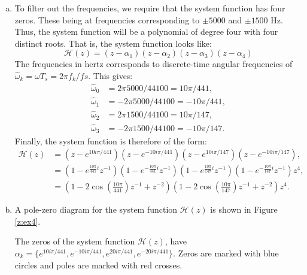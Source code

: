 \begin{enumerate}
\begin{enumerate}[a)]
\item To filter out the frequencies, we require that the system function has four zeros. These being at frequencies corresponding to $\pm5000$ and $\pm1500$ Hz. Thus, the system function will be a polynomial of degree four with four distinct roots. That is, the system function looks like:
$$\mathcal{H}(z)=(z-\alpha_1)(z-\alpha_2)(z-\alpha_3)(z-\alpha_4)$$
The frequencies in hertz corresponds to discrete-time angular frequencies of $\hat{\omega}_k=\omega T_s=2\pi f_k/fs$. This gives:
\begin{align*}
    \hat{\omega}_{0} &=  2\pi5000/44100 =  10\pi/441,\\
    \hat{\omega}_{1} &= -2\pi5000/44100 = -10\pi/441,\\
    \hat{\omega}_{2} &=  2\pi1500/44100 =  10\pi/147,\\
    \hat{\omega}_{3} &= -2\pi1500/44100 = -10\pi/147.
\end{align*}
Finally, the system function is therefore of the form:
\begin{align*}
    \mathcal{H}(z)&=(z-e^{10i\pi/441})(z-e^{-10i\pi/441})(z-e^{10i\pi/147})(z-e^{-10i\pi/147}), \\
    &=(1-e^{\frac{10\pi}{441}i}z^{-1})(1-e^{-\frac{10\pi}{441}i}z^{-1})(1-e^{\frac{10\pi}{147}i}z^{-1})(1-e^{-\frac{10\pi}{147}i}z^{-1})z^{4},\\
    &=(1-2\cos\left(\frac{10\pi}{441}\right)z^{-1}+z^{-2})(1-2\cos\left(\frac{10\pi}{147}\right)z^{-1}+z^{-2})z^{4}.
\end{align*}

\item A pole-zero diagram for the system function $\mathcal{H}(z)$ is shown in Figure \ref{z:ex4}.

\begin{marginfigure}[-5cm]
\begin{center}
\end{center}
\caption{The zeros of the system function $\mathcal{H}(z)$,
have $\alpha_k=\{e^{10i\pi/441},e^{-10i\pi/441},e^{20i\pi/441},e^{-20i\pi/441}\}$. Zeros are marked with blue circles and poles are marked with red crosses.}
\label{z:ex4}
\end{marginfigure}


\end{enumerate}
\end{enumerate}
